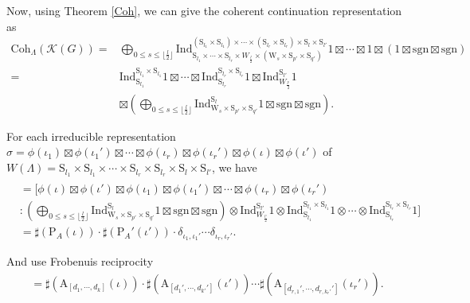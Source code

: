 \documentclass[12pt, a4paper]{amsart}
\numberwithin{equation}{section}
\newcommand{\CK}{{\mathcal {K}}}
\newcommand{\Ind}{{\mathrm{Ind}}}
\newcommand{\sgn}{{\mathrm{sgn}}}
\begin{document}
Now, using Theorem \ref{Coh}, we can give the coherent continuation representation as
\begin{align*}
    \mathrm{Coh}_{\Lambda}(\CK(G))  = &\bigoplus_{0 \leq s \leq \lfloor\frac{l}{2}\rfloor} \Ind _{\mathrm{S}_{l_1} \times \cdots \times \mathrm{S}_{l_r} \times W_{\frac{l}{2}} \times (\mathrm{W}_{s} \times \mathrm{S}_{p'} \times \mathrm{S}_{q'})}^{(\mathrm{S}_{l_1} \times \mathrm{S}_{l_1}) \times \cdots \times (\mathrm{S}_{l_r} \times \mathrm{S}_{l_r}) \times \mathrm{S}_{l} \times \mathrm{S}_{l'}} 1 \boxtimes \cdots \boxtimes 1 \boxtimes (1 \boxtimes \sgn \boxtimes \sgn) \\
    = &\Ind_{\mathrm{S}_{l_1}}^{\mathrm{S}_{l_1}\times \mathrm{S}_{l_1}}1 \boxtimes \cdots \boxtimes \Ind_{\mathrm{S}_{l_r}}^{\mathrm{S}_{l_r}\times \mathrm{S}_{l_r}}1 \boxtimes \Ind_{W_{\frac{l'}{2}}}^{\mathrm{S}_{l'}} 1\\
    & \boxtimes (\bigoplus_{0 \leq s \leq \lfloor\frac{l}{2}\rfloor}\Ind _{\mathrm{W}_{s} \times \mathrm{S}_{p'} \times \mathrm{S}_{q'}}^{\mathrm{S}_{l}}1 \boxtimes \sgn \boxtimes \sgn ).
\end{align*}

For each irreducible representation $\sigma =  \phi(\iota_1) \boxtimes \phi(\iota_1') \boxtimes \cdots \boxtimes \phi(\iota_r) \boxtimes \phi(\iota_r')\boxtimes \phi(\iota) \boxtimes \phi(\iota')$ of $W(\Lambda) = \mathrm{S}_{l_1} \times \mathrm{S}_{l_1} \times \cdots \times \mathrm{S}_{l_r} \times \mathrm{S}_{l_r} \times \mathrm{S}_{l} \times \mathrm{S}_{l'}$, we have
\begin{align*}
    [\sigma: &\mathrm{Coh}_{\Lambda}(\CK(G))]\\
    &= [\phi(\iota) \boxtimes \phi(\iota') \boxtimes \phi(\iota_1) \boxtimes \phi(\iota_1') \boxtimes \cdots \boxtimes \phi(\iota_r) \boxtimes \phi(\iota_r')\\
    &:(\bigoplus_{0 \leq s \leq \lfloor\frac{l}{2}\rfloor}\Ind _{\mathrm{W}_{s} \times \mathrm{S}_{p'} \times \mathrm{S}_{q'}}^{\mathrm{S}_{l}}1 \boxtimes \sgn \boxtimes \sgn ) \otimes \Ind_{W_{\frac{l'}{2}}}^{\mathrm{S}_{l'}} 1 \otimes \Ind_{\mathrm{S}_{l_1}}^{\mathrm{S}_{l_1}\times \mathrm{S}_{l_1}}1 \otimes \cdots \otimes \Ind_{\mathrm{S}_{l_r}}^{\mathrm{S}_{l_r}\times \mathrm{S}_{l_r}}1]\\
    & = \sharp(\mathrm{P}_A(\iota))\cdot \sharp(\mathrm{P}_{A}'(\iota'))\cdot \delta_{\iota_1,\iota_1'} \cdots \delta_{\iota_r,\iota_r'}. 
\end{align*}

And use Frobenuis reciprocity
\begin{align*}
    [1_{W_{\nu}}: \sigma] = \sharp(\mathrm{A}_{[d_1,\cdots,d_k]}(\iota))\cdot \sharp(\mathrm{A}_{[d_1',\cdots,d_{k'}']}(\iota'))\cdots \sharp(\mathrm{A}_{[d_{r,1}',\cdots,d_{r,k_r'}']}(\iota_r')).
\end{align*}
\end{document}
